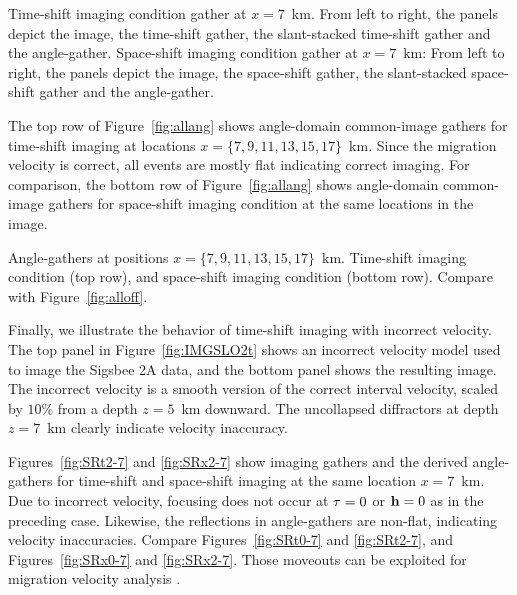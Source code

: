 {
Time-shift imaging condition gather at $x=7$~km.
From left to right, the panels depict
the image,
the time-shift gather,
the slant-stacked time-shift gather and
the angle-gather.}
{
Space-shift imaging condition gather at $x=7$~km:
From left to right, the panels depict
the image,
the space-shift gather,
the slant-stacked space-shift gather and
the angle-gather.}

The top row of Figure~\ref{fig:allang} shows angle-domain 
common-image gathers for time-shift imaging
at locations $x=\{7,9,11,13,15,17\}$~km. 
Since the migration velocity is correct, all events are mostly
flat indicating correct imaging.
For comparison, 
the bottom row of Figure~\ref{fig:allang} shows
angle-domain common-image gathers for space-shift 
imaging condition at the same locations in the image.

{
Angle-gathers at positions $x=\{7,9,11,13,15,17\}$~km.
Time-shift imaging condition (top row), and
space-shift imaging condition (bottom row).
Compare with Figure~\ref{fig:alloff}.}

Finally, we illustrate the behavior of 
time-shift imaging with incorrect velocity.
The top panel in Figure~\ref{fig:IMGSLO2t} shows an incorrect 
velocity model used to image the Sigsbee 2A data, and
the bottom panel shows the resulting image. The incorrect
velocity is a smooth version of the correct interval velocity,
scaled by $10\%$ from a depth $z=5$~km downward.
The uncollapsed diffractors at depth $z=7$~km clearly indicate
velocity inaccuracy.

Figures~\ref{fig:SRt2-7} and \ref{fig:SRx2-7} show
imaging gathers and the derived angle-gathers for time-shift and 
space-shift imaging at the same location $x=7$~km.
Due to incorrect velocity, focusing does not occur
at $\tt=0$ or $\hh=0$ as in the preceding case.
Likewise, the reflections in angle-gathers are non-flat,
indicating velocity inaccuracies.
Compare Figures~\ref{fig:SRt0-7} and \ref{fig:SRt2-7},
and Figures~\ref{fig:SRx0-7} and \ref{fig:SRx2-7}.
Those moveouts can be exploited for migration velocity 
analysis 
\cite[]{
SEG-1999-17231726,
Sava.gp.wemva1,Sava.gp.wemva2,
clapp.geology}.

